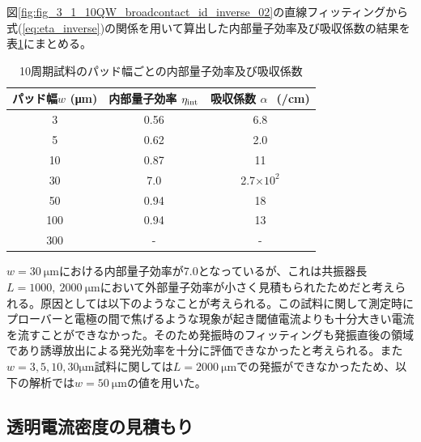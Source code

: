 {{\newpage
図\ref{fig:fig_3_1_10QW_broadcontact_id_inverse_02}の直線フィッティングから式(\ref{eq:eta_inverse})の関係を用いて算出した内部量子効率及び吸収係数の結果を表\ref{table:table_10QW_i_int}にまとめる。
\begin{table}[h]
  \caption{10周期試料のパッド幅ごとの内部量子効率及び吸収係数}
  \label{table:table_10QW_i_int}
  \centering
  \begin{tabular}{ccc}
    \hline
    パッド幅$w$ (\si{\micro\metre})  &  内部量子効率 $\eta_{\rm{int}} $ &吸収係数 $\alpha\ $\ (/\si{cm}) \\
    \hline \hline
     3 & 0.56 & 6.8 \\
    5  & 0.62 & 2.0\\
    10  & 0.87 & 11\\ 
    30& 7.0& 2.7$\times 10^2$\\
    50& 0.94&18 \\
    100& 0.94& 13\\
    300&- & -\\
    \hline
  \end{tabular}
\end{table}
$w=30\ \si{\micro\metre}$における内部量子効率が7.0となっているが、これは共振器長$L=1000,\  2000\ \si{\micro\metre}$において外部量子効率が小さく見積もられたためだと考えられる。原因としては以下のようなことが考えられる。この試料に関して測定時にプローバーと電極の間で焦げるような現象が起き閾値電流よりも十分大きい電流を流すことができなかった。そのため発振時のフィッティングも発振直後の領域であり誘導放出による発光効率を十分に評価できなかったと考えられる。また$w=3, 5, 10, 30 \si{\micro\metre}$試料に関しては$L=2000\ \si{\micro\metre}$での発振ができなかったため、以下の解析では$w=50\ \si{\micro\metre}$の値を用いた。

\clearpage
\subsection{透明電流密度の見積もり}

}}
